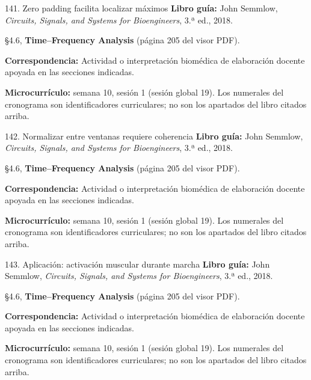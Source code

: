 \documentclass[
  10pt,
  ignorenonframetext,
  aspectratio=169,
  spanish,
]{beamer}
\begin{document}
\begin{frame}{141. Zero padding facilita localizar máximos}
\label{zero-padding-facilita-localizar-muxe1ximos}
\textbf{Libro guía:} John Semmlow, \emph{Circuits, Signals, and Systems
for Bioengineers}, 3.ª ed., 2018.

§4.6, \textbf{Time--Frequency Analysis} (página 205 del visor PDF).

\textbf{Correspondencia:} Actividad o interpretación biomédica de
elaboración docente apoyada en las secciones indicadas.

\textbf{Microcurrículo:} semana 10, sesión 1 (sesión global 19). Los
numerales del cronograma son identificadores curriculares; no son los
apartados del libro citados arriba.
\end{frame}

\begin{frame}{142. Normalizar entre ventanas requiere coherencia}
\label{normalizar-entre-ventanas-requiere-coherencia}
\textbf{Libro guía:} John Semmlow, \emph{Circuits, Signals, and Systems
for Bioengineers}, 3.ª ed., 2018.

§4.6, \textbf{Time--Frequency Analysis} (página 205 del visor PDF).

\textbf{Correspondencia:} Actividad o interpretación biomédica de
elaboración docente apoyada en las secciones indicadas.

\textbf{Microcurrículo:} semana 10, sesión 1 (sesión global 19). Los
numerales del cronograma son identificadores curriculares; no son los
apartados del libro citados arriba.
\end{frame}

\begin{frame}{143. Aplicación: activación muscular durante marcha}
\label{aplicaciuxf3n-activaciuxf3n-muscular-durante-marcha}
\textbf{Libro guía:} John Semmlow, \emph{Circuits, Signals, and Systems
for Bioengineers}, 3.ª ed., 2018.

§4.6, \textbf{Time--Frequency Analysis} (página 205 del visor PDF).

\textbf{Correspondencia:} Actividad o interpretación biomédica de
elaboración docente apoyada en las secciones indicadas.

\textbf{Microcurrículo:} semana 10, sesión 1 (sesión global 19). Los
numerales del cronograma son identificadores curriculares; no son los
apartados del libro citados arriba.
\end{frame}
\end{document}
